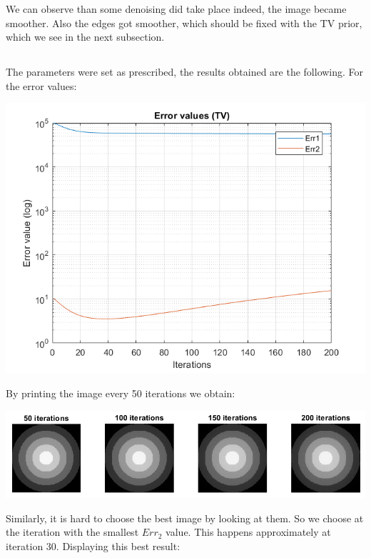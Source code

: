 \documentclass[a4paper]{iacas}
\begin{document}
We can observe than some denoising did take place indeed, the image became smoother. Also the edges got smoother, which should be fixed with the TV prior, which we see in the next subsection.

\subsection{}
The parameters were set as prescribed, the results obtained are the following. For the error values:

\vskip 0.1in
\begin{minipage}{0.5\textwidth}
\centering
	\includegraphics[scale=0.8]{output/q5/TV_err.png}
\end{minipage}
\vskip 0.1in
By printing the image every 50 iterations we obtain:
\vskip 0.1in
\begin{minipage}{0.5\textwidth}
\centering
	\includegraphics[scale=0.6]{output/q5/TV_iter.png}
\end{minipage}
\vskip 0.1in

Similarly, it is hard to choose the best image by looking at them. So we choose at the iteration with the smallest $Err_{2}$ value. This happens approximately at iteration 30. Displaying this best result:
\end{document}
